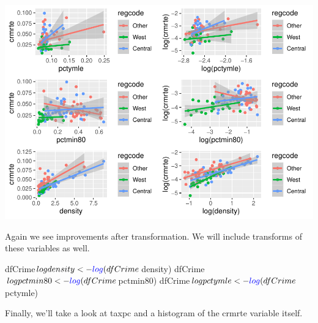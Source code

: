\documentclass[]{article}
\newenvironment{Shaded}{}{}
\newcommand{\KeywordTok}[1]{\textcolor[rgb]{0.00,0.00,1.00}{#1}}
\newcommand{\NormalTok}[1]{#1}
\newcommand{\OperatorTok}[1]{#1}
\newcommand{\StringTok}[1]{\textcolor[rgb]{0.00,0.50,0.50}{#1}}
\begin{document}
\includegraphics{Bagnard_Gaustad_Hartman_Leung_Lab_3_files/figure-latex/unnamed-chunk-96-1.pdf}

Again we see improvements after transformation. We will include
transforms of these variables as well.

\begin{Shaded}
\begin{Highlighting}[]
\NormalTok{dfCrime}\OperatorTok{$}\NormalTok{logdensity <-}\StringTok{ }\KeywordTok{log}\NormalTok{(dfCrime}\OperatorTok{$}\NormalTok{density)}
\NormalTok{dfCrime}\OperatorTok{$}\NormalTok{logpctmin80 <-}\StringTok{ }\KeywordTok{log}\NormalTok{(dfCrime}\OperatorTok{$}\NormalTok{pctmin80)}
\NormalTok{dfCrime}\OperatorTok{$}\NormalTok{logpctymle <-}\StringTok{ }\KeywordTok{log}\NormalTok{(dfCrime}\OperatorTok{$}\NormalTok{pctymle)}
\end{Highlighting}
\end{Shaded}

Finally, we'll take a look at taxpc and a histogram of the crmrte
variable itself.
\end{document}
